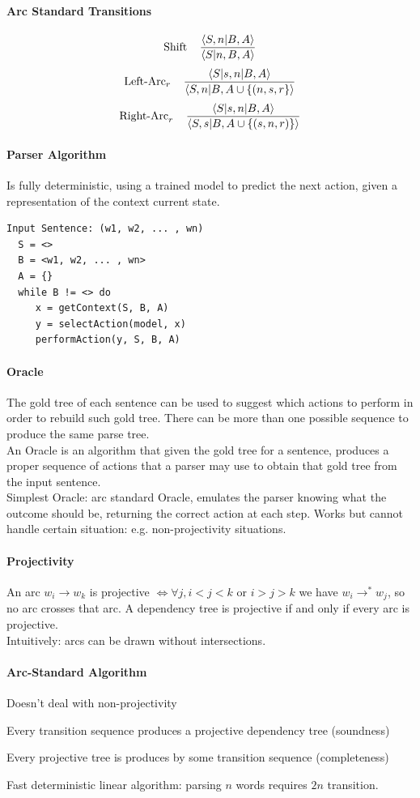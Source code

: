 \documentclass[10pt]{report}
\begin{document}
\paragraph{Arc Standard Transitions}
$$\hbox{Shift}\:\:\:\:\:\frac{\langle S, n|B, A\rangle}{\langle S|n, B, A\rangle}$$
$$\hbox{Left-Arc}_r\:\:\:\:\:\frac{\langle S|s, n|B, A\rangle}{\langle S, n|B, A\cup\{(n, s, r\}\rangle}$$
$$\hbox{Right-Arc}_r\:\:\:\:\:\frac{\langle S|s, n|B, A\rangle}{\langle S, s|B, A\cup\{(s,n,r)\}\rangle}$$
\paragraph{Parser Algorithm} Is fully deterministic, using a trained model to predict the next action, given a representation of the context current state.
\begin{lstlisting}
Input Sentence: (w1, w2, ... , wn)
  S = <>
  B = <w1, w2, ... , wn>
  A = {}
  while B != <> do
	 x = getContext(S, B, A)
	 y = selectAction(model, x)
	 performAction(y, S, B, A)
\end{lstlisting}
\paragraph{Oracle} The gold tree of each sentence can be used to suggest which actions to perform in order to rebuild such gold tree. There can be more than one possible sequence to produce the same parse tree.\\
An Oracle is an algorithm that given the gold tree for a sentence, produces a proper sequence of actions that a parser may use to obtain that gold tree from the input sentence.\\
Simplest Oracle: arc standard Oracle, emulates the parser knowing what the outcome should be, returning the correct action at each step. Works but cannot handle certain situation: e.g. non-projectivity situations.
\paragraph{Projectivity} An arc $w_i\rightarrow w_k$ is projective $\Leftrightarrow\forall j,i<j<k$ or $i>j>k$ we have $w_i\rightarrow^* w_j$, so no arc crosses that arc. A dependency tree is projective if and only if every arc is projective.\\
Intuitively: arcs can be drawn without intersections.
\paragraph{Arc-Standard Algorithm}\begin{list}{}{}
	\item Doesn't deal with non-projectivity
	\item Every transition sequence produces a projective dependency tree (soundness)
	\item Every projective tree is produces by some transition sequence (completeness)
	\item Fast deterministic linear algorithm: parsing $n$ words requires $2n$ transition.
\end{list}
\end{document}
